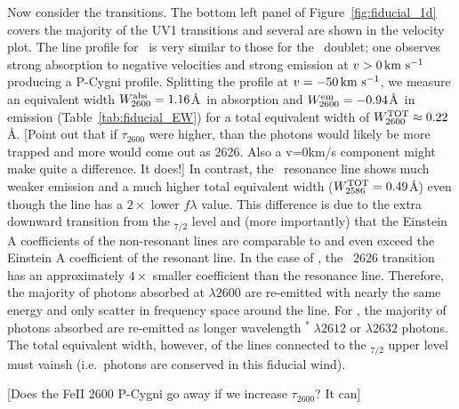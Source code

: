 \documentclass[12pt,preprint]{aastex}
\begin{document}
Now consider the  transitions.
The bottom left panel of Figure~\ref{fig:fiducial_1d} covers the
majority of the  UV1 transitions and several are
shown in the velocity plot.  The line
profile for \feiib\ is very similar to those for the \mgiid\ doublet;
one observes strong absorption to negative velocities and strong
emission at $v > 0 \, {\rm km~s^{-1}}$ producing a P-Cygni profile.  Splitting
the profile at $v = -50 \, {\rm km~s^{-1}}$, we measure an equivalent width
$W_{2600}^{\rm abs} = 1.16$\AA\ in absorption and $W_{2600}^{\rm em} =
-0.94$\AA\ in emission (Table~\ref{tab:fiducial_EW}) for a total
equivalent width of $W_{2600}^{\rm TOT} \approx 0.22$\AA.  
[Point out that if $\tau_{2600}$ were higher, than the photons would
likely be more trapped and more would come out as 2626.  Also a
v=0km/s component might make quite a difference. It does!]
In contrast, the \feiia\ resonance line shows much weaker emission and
a much higher total equivalent width ($W_{2586}^{\rm TOT} = 0.49$\AA)
even though the line has a $2 \times$ lower $f\lambda$ value.
This difference is due to the extra downward transition from the
\zconfig$_{7/2}$ level and (more importantly) that the Einstein A
coefficients of the non-resonant lines are comparable to and even
exceed the Einstein A coefficient of
the resonant line.  In the case of \feiib, the
~2626 transition 
has an approximately  $4\times$ smaller coefficient than the
resonance line.  Therefore, the majority of photons absorbed at
$\lambda 2600$ are re-emitted with nearly the same energy and only scatter 
in frequency space around the line.  For \feiia, 
the majority of photons absorbed are re-emitted 
as longer wavelength $^* \; \lambda 2612$ or $\lambda 2632$
photons.  
The total equivalent width, however, of the lines connected to the
\zconfig$_{7/2}$ upper level must vainsh (i.e.\ photons are conserved
in this fiducial wind).

[Does the FeII 2600 P-Cygni go away if we increase $\tau_{2600}$? It
can]
\end{document}

